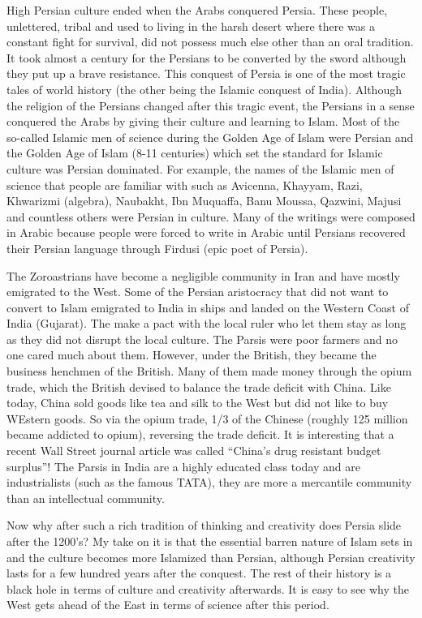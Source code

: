 \begin{footnotesize}
\begin{sffamily}
High Persian culture ended when the Arabs conquered Persia. These people, unlettered, tribal and used to living in the harsh desert where there was a constant fight for survival, did not possess much else other than an oral tradition. It took almost a century for the Persians to be converted by the sword although they put up a brave resistance. This conquest of Persia is one of the most tragic tales of world history (the other being the Islamic conquest of India). Although the religion of the Persians changed after this tragic event, the Persians in a sense conquered the Arabs by giving their culture and learning to Islam. Most of the so-called Islamic men of science during the Golden Age of Islam were Persian and the Golden Age of Islam (8-11 centuries) which set the standard for Islamic culture was Persian dominated. For example, the names of the Islamic men of science that people are familiar with such as Avicenna, Khayyam, Razi, Khwarizmi (algebra), Naubakht, Ibn Muquaffa, Banu Moussa, Qazwini, Majusi and countless others were Persian in culture. Many of the writings were composed in Arabic because people were forced to write in Arabic until Persians recovered their Persian language through Firdusi (epic poet of Persia).

The Zoroastrians have become a negligible community in Iran and have mostly emigrated to the West. Some of the Persian aristocracy that did not want to convert to Islam emigrated to India in ships and landed on the Western Coast of India (Gujarat). The make a pact with the local ruler who let them stay as long as they did not disrupt the local culture. The Parsis were poor farmers and no one cared much about them. However, under the British, they became the business henchmen of the British. Many of them made money through the opium trade, which the British devised to balance the trade deficit with China. Like today, China sold goods like tea and silk to the West but did not like to buy WEstern goods. So via the opium trade, 1/3 of the Chinese (roughly 125 million became addicted to opium), reversing the trade deficit. It is interesting that a recent Wall Street journal article was called ``China's drug resistant budget surplus''! The Parsis in India are a highly educated class today and are industrialists (such as the famous TATA), they are more a mercantile community than an intellectual community.

Now why after such a rich tradition of thinking and creativity does Persia slide after the 1200's? My take on it is that the essential barren nature of Islam sets in and the culture becomes more Islamized than Persian, although Persian creativity lasts for a few hundred years after the conquest. The rest of their history is a black hole in terms of culture and creativity afterwards. It is easy to see why the West gets ahead of the East in terms of science after this period.


\end{sffamily}
\end{footnotesize}
